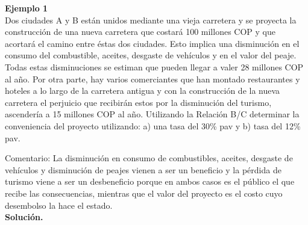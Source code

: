 \textbf{Ejemplo 1}\\

Dos ciudades A y B están unidos mediante una vieja carretera y se proyecta la construcción de una nueva carretera que costará  100 millones COP y que acortará el camino entre éstas dos ciudades. Esto implica una disminución en el consumo del combustible, aceites, desgaste de vehículos y en el valor del peaje. Todas estas disminuciones se estiman que pueden llegar a valer 28 millones COP al año. Por otra parte, hay varios comerciantes que han montado restaurantes y hoteles a lo largo de la carretera antigua y con la construcción de la nueva carretera el perjuicio que recibirán estos por la disminución del turismo, ascendería a  15 millones COP al año. Utilizando la Relación B/C determinar la conveniencia del proyecto utilizando: a) una tasa del 30\% pav y b) tasa del 12\% pav.


Comentario: La disminución en consumo de combustibles, aceites, desgaste de
vehículos y disminución de peajes vienen a ser un beneficio y la pérdida de turismo viene
a ser un desbeneficio porque en ambos casos es el público el que recibe las consecuencias, mientras que el valor del proyecto es el costo cuyo desembolso la hace el estado.
\\

\textbf{Solución.}\\


